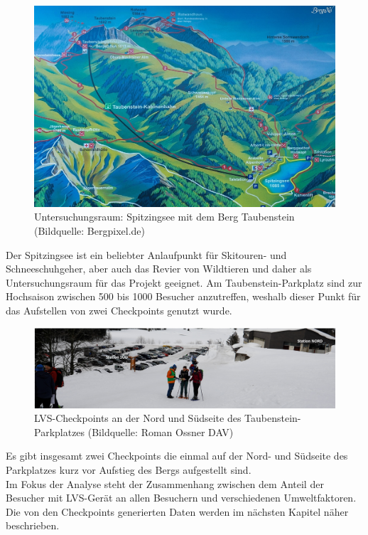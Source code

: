 \documentclass[12pt]{scrreprt}
\begin{document}
\begin{figure}[H]
	\centering
	\includegraphics[width=\linewidth]{plots/spitzingsee}
	\caption{Untersuchungsraum: Spitzingsee mit dem Berg Taubenstein \\ (Bildquelle: Bergpixel.de)}
	\label{pic:spitzingsee}	
\end{figure}
\noindent Der Spitzingsee ist ein beliebter Anlaufpunkt für Skitouren- und Schneeschuhgeher, aber auch das Revier von Wildtieren und daher als Untersuchungsraum für das Projekt geeignet.  Am Taubenstein-Parkplatz sind zur Hochsaison zwischen 500 bis 1000 Besucher anzutreffen, weshalb dieser Punkt für das Aufstellen von zwei Checkpoints genutzt wurde. %
\begin{figure}[H]
	\centering
	\includegraphics[width=\linewidth]{plots/checkpoint}
	\caption{LVS-Checkpoints an der Nord und Südseite des Taubenstein-Parkplatzes (Bildquelle: Roman Ossner DAV)}
	\label{pic:checkpoint}	
\end{figure}
\noindent Es gibt insgesamt zwei Checkpoints die einmal auf der Nord- und Südseite des Parkplatzes kurz vor Aufstieg des Bergs aufgestellt sind. \\
Im Fokus der Analyse steht der Zusammenhang zwischen dem Anteil der Besucher mit LVS-Gerät an allen Besuchern und verschiedenen Umweltfaktoren. Die von den Checkpoints generierten Daten werden im nächsten Kapitel näher beschrieben. 
\end{document}
